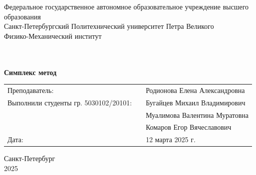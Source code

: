 \begin{titlepage}
    \centering
    \vspace*{0.5cm}

    \large{Федеральное государственное автономное образовательное учреждение высшего образования}\\
    \Large{Санкт-Петербургский Политехнический университет Петра Великого}\\
    \Large{Физико-Механический институт}\\

    \vspace{5cm}

    \\
    \vspace{0.5cm}
    \\
    \textbf{\Huge{Симплекс метод}}\\

    \vspace{4cm}
    \large

    \centering
    \begin{tabular}{lcl}
        Преподаватель:                       & \hspace{0.6cm} & Родионова Елена Александровна\\
        Выполнили студенты гр. 5030102/20101:&                & Бугайцев Михаил Владимирович\\
                                             &                & Муалимова Валентина Муратовна  \\
                                             &                & Комаров Егор Вячеславович \\
        Дата:                                &                & 12 марта 2025 г.\\
    \end{tabular}
    
    \vfill

    \Large
    Санкт-Петербург\\
    2025

\end{titlepage}
